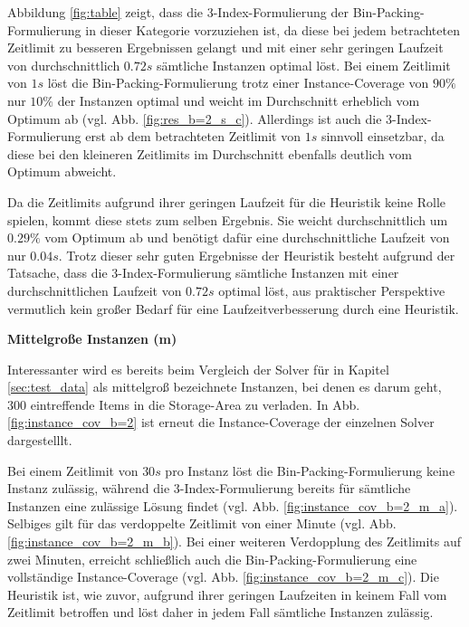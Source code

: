 Abbildung \ref{fig:table} zeigt, dass die 3-Index-Formulierung der Bin-Packing-Formulierung in dieser Kategorie vorzuziehen ist,
da diese bei jedem betrachteten Zeitlimit zu besseren Ergebnissen gelangt und mit einer sehr geringen Laufzeit
von durchschnittlich $0.72s$ sämtliche Instanzen optimal löst. Bei einem Zeitlimit von $1s$ löst die Bin-Packing-Formulierung trotz einer Instance-Coverage von $90 \%$ nur $10 \%$ der Instanzen optimal und weicht im Durchschnitt erheblich vom Optimum ab (vgl. Abb. \ref{fig:res_b=2_s_c}).
Allerdings ist auch die 3-Index-Formulierung erst ab dem betrachteten Zeitlimit von $1s$ sinnvoll einsetzbar,
da diese bei den kleineren Zeitlimits im Durchschnitt ebenfalls deutlich vom Optimum abweicht.

Da die Zeitlimits aufgrund ihrer geringen Laufzeit für die Heuristik keine Rolle spielen, kommt diese stets zum selben Ergebnis. Sie weicht durchschnittlich um $0.29 \%$ vom Optimum ab und benötigt dafür eine durchschnittliche Laufzeit von nur $0.04s$.
Trotz dieser sehr guten Ergebnisse der Heuristik besteht aufgrund der Tatsache, dass die 3-Index-Formulierung sämtliche Instanzen
mit einer durchschnittlichen Laufzeit von $0.72s$ optimal löst, aus praktischer Perspektive vermutlich kein großer Bedarf für
eine Laufzeitverbesserung durch eine Heuristik.

\textbf{Mittelgroße Instanzen (m)}

Interessanter wird es bereits beim Vergleich der Solver für in Kapitel \ref{sec:test_data} als mittelgroß bezeichnete Instanzen,
bei denen es darum geht, $300$ eintreffende Items in die Storage-Area zu verladen.
In Abb. \ref{fig:instance_cov_b=2} ist erneut die Instance-Coverage der einzelnen Solver dargestelllt.

Bei einem Zeitlimit von $30s$ pro Instanz löst die Bin-Packing-Formulierung keine Instanz zulässig, während die 3-Index-Formulierung bereits für sämtliche Instanzen eine zulässige Lösung findet (vgl. Abb. \ref{fig:instance_cov_b=2_m_a}).
Selbiges gilt für das verdoppelte Zeitlimit von einer Minute (vgl. Abb. \ref{fig:instance_cov_b=2_m_b}). Bei einer weiteren
Verdopplung des Zeitlimits auf zwei Minuten, erreicht schließlich auch die Bin-Packing-Formulierung eine vollständige Instance-Coverage (vgl. Abb. \ref{fig:instance_cov_b=2_m_c}). Die Heuristik ist, wie zuvor, aufgrund ihrer geringen Laufzeiten
in keinem Fall vom Zeitlimit betroffen und löst daher in jedem Fall sämtliche Instanzen zulässig.


